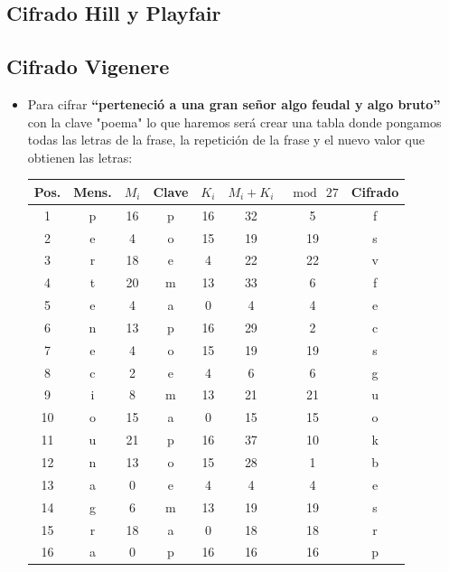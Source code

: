 \subsection{Cifrado Hill y Playfair}


\subsection{Cifrado Vigenere}

\begin{itemize}
	\item Para cifrar \textbf{``perteneció a una gran señor algo feudal y algo bruto''} con la clave
	"poema" lo que haremos será crear una tabla donde pongamos todas las letras de la frase,
	la repetición de la frase y el nuevo valor que obtienen las letras:

           	\begin{table}[H]
            \centering
            \begin{tabular}{|c|c|c|c|c|c|c|c|}
            \hline
            \textbf{Pos.} & \textbf{Mens.} & $M_i$ & \textbf{Clave} & $K_i$ & $M_i + K_i$ & $\bmod\ 27$ & \textbf{Cifrado} \\
            \hline
            1  & p & 16 & p & 16 & 32 & 5  & f \\
            2  & e & 4  & o & 15 & 19 & 19 & s \\
            3  & r & 18 & e & 4  & 22 & 22 & v \\
            4  & t & 20 & m & 13 & 33 & 6  & f \\
            5  & e & 4  & a & 0  & 4  & 4  & e \\
            6  & n & 13 & p & 16 & 29 & 2  & c \\
            7  & e & 4  & o & 15 & 19 & 19 & s \\
            8  & c & 2  & e & 4  & 6  & 6  & g \\
            9  & i & 8  & m & 13 & 21 & 21 & u \\
            10 & o & 15 & a & 0  & 15 & 15 & o \\
            11 & u & 21 & p & 16 & 37 & 10 & k \\
            12 & n & 13 & o & 15 & 28 & 1  & b \\
            13 & a & 0  & e & 4  & 4  & 4  & e \\
            14 & g & 6  & m & 13 & 19 & 19 & s \\
            15 & r & 18 & a & 0  & 18 & 18 & r \\
            16 & a & 0  & p & 16 & 16 & 16 & p \\

\end{tabular}
\end{table}
\end{itemize}
